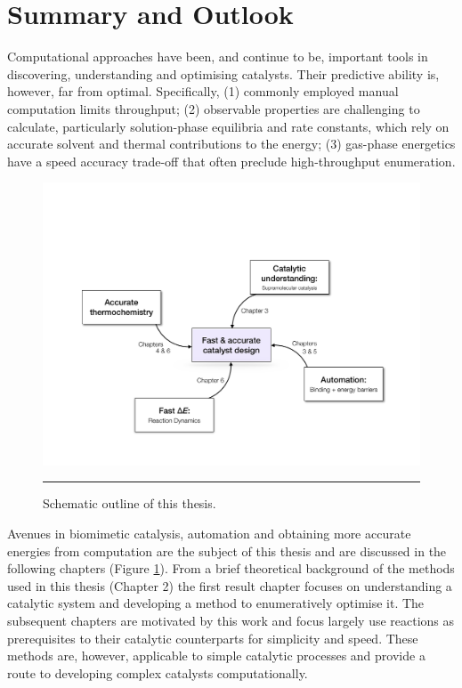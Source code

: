 \documentclass[../main.tex]{subfiles}
\begin{document}
\section{Summary and Outlook}

Computational approaches have been, and continue to be, important tools in discovering, understanding and optimising catalysts. Their predictive ability is, however, far from optimal. Specifically, (1) commonly employed manual computation limits throughput; (2) observable properties are challenging to calculate, particularly solution-phase equilibria and rate constants, which rely on accurate solvent and thermal contributions to the energy; (3) gas-phase energetics have a speed accuracy trade-off that often preclude high-throughput enumeration.

\begin{figure}[h!]
	\centering
	\vspace{0.1cm}
	\includegraphics[width=12.5cm]{1/figs/fig3/outline.pdf}
	\vspace{0.2cm}
	\hrule
	\caption{Schematic outline of this thesis.}
	\label{fig::intro_2}
\end{figure}

Avenues in biomimetic catalysis, automation and obtaining more accurate energies from computation are the subject of this thesis and are discussed in the following chapters (Figure \ref{fig::intro_2}). From a brief theoretical background of the methods used in this thesis (Chapter 2) the first result chapter focuses on understanding a catalytic system and developing a method to enumeratively optimise it. The subsequent chapters are motivated by this work and focus largely use reactions as prerequisites to their catalytic counterparts for simplicity and speed. These methods are, however, applicable to simple catalytic processes and provide a route to developing complex catalysts computationally.









\clearpage
\end{document}

